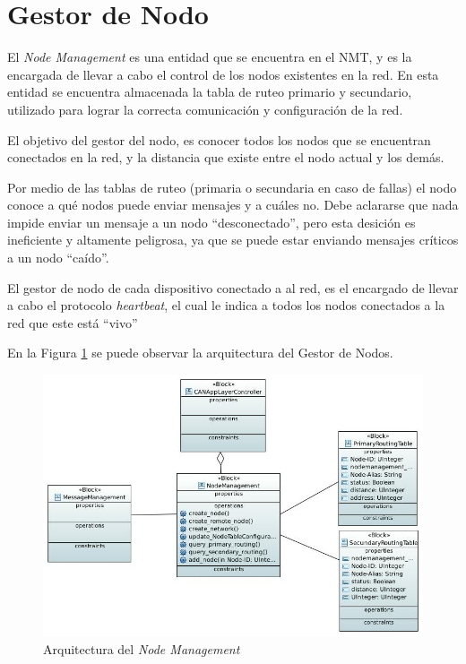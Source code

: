 \section{Gestor de Nodo}
El \textit{Node Management} es una entidad que se encuentra en el NMT, y es la
encargada de llevar a cabo el control de los nodos existentes en la red. En
esta entidad se encuentra almacenada la tabla de ruteo primario y secundario,
utilizado para lograr la correcta comunicación y configuración de la red.

El objetivo del gestor del nodo, es conocer todos los nodos que se encuentran
conectados en la red, y la distancia que existe entre el nodo actual y los
demás.

Por medio de las tablas de ruteo (primaria o secundaria en caso de fallas) el
nodo conoce a qué nodos puede enviar mensajes y a cuáles no. Debe aclararse que
nada impide enviar un mensaje a un nodo ``desconectado'', pero esta desición es
ineficiente y altamente peligrosa, ya que se puede estar enviando mensajes
críticos a un nodo ``caído''.

El gestor de nodo de cada dispositivo conectado a al red, es el encargado de
llevar a cabo el protocolo \textit{heartbeat}, el cual le indica a todos los
nodos conectados a la red que este está ``vivo''

En la Figura \ref{fig:Gestor_Nodo} se puede observar la arquitectura del Gestor
de Nodos.

\begin{figure}[h!]
 \centering
 \includegraphics[scale=0.4]{images/Secciones/AppendixA/NodeManagement.JPG}
  \caption{Arquitectura del \textit{Node Management}}
\label{fig:Gestor_Nodo}
\end{figure}

